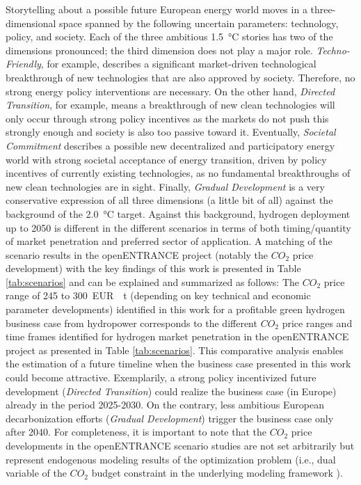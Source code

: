 \documentclass[review]{elsarticle}
\begin{document}
Storytelling about a possible future European energy world moves in a three-dimensional space spanned by the following uncertain parameters: technology, policy, and society. Each of the three ambitious \SI{1.5}{\degreeCelsius} stories has two of the dimensions pronounced; the third dimension does not play a major role. \textit{Techno-Friendly}, for example, describes a significant market-driven technological breakthrough of new technologies that are also approved by society. Therefore, no strong energy policy interventions are necessary. On the other hand, \textit{Directed Transition}, for example, means a breakthrough of new clean technologies will only occur through strong policy incentives as the markets do not push this strongly enough and society is also too passive toward it. Eventually, \textit{Societal Commitment} describes a possible new decentralized and participatory energy world with strong societal acceptance of energy transition, driven by policy incentives of currently existing technologies, as no fundamental breakthroughs of new clean technologies are in sight. Finally, \textit{Gradual Development} is a very conservative expression of all three dimensions (a little bit of all) against the background of the \SI{2.0}{\degreeCelsius} target. Against this background, hydrogen deployment up to 2050 is different in the different scenarios in terms of both timing/quantity of market penetration and preferred sector of application. A matching of the scenario results in the {openENTRANCE} project (notably the $CO_2$ price development) with the key findings of this work is presented in Table \ref{tab:scenarios} and can be explained and summarized as follows: The $CO_2$ price range of \SI{245}{} to \SI{300}{EUR \per \tonne} (depending on key technical and economic parameter developments) identified in this work for a profitable green hydrogen business case from hydropower corresponds to the different $CO_2$ price ranges and time frames identified for hydrogen market penetration in the {openENTRANCE} project as presented in Table \ref{tab:scenarios}. This comparative analysis enables the estimation of a future timeline when the business case presented in this work could become attractive. Exemplarily, a strong policy incentivized future development (\textit{Directed Transition}) could realize the business case (in Europe) already in the period 2025-2030. On the contrary, less ambitious European decarbonization efforts (\textit{Gradual Development}) trigger the business case only after 2040. For completeness, it is important to note that the $CO_2$ price developments in the {openENTRANCE} scenario studies are not set arbitrarily but represent endogenous modeling results of the optimization problem (i.e., dual variable of the $CO_2$ budget constraint in the underlying modeling framework \cite{burandt2018genesys}). 
\end{document}
